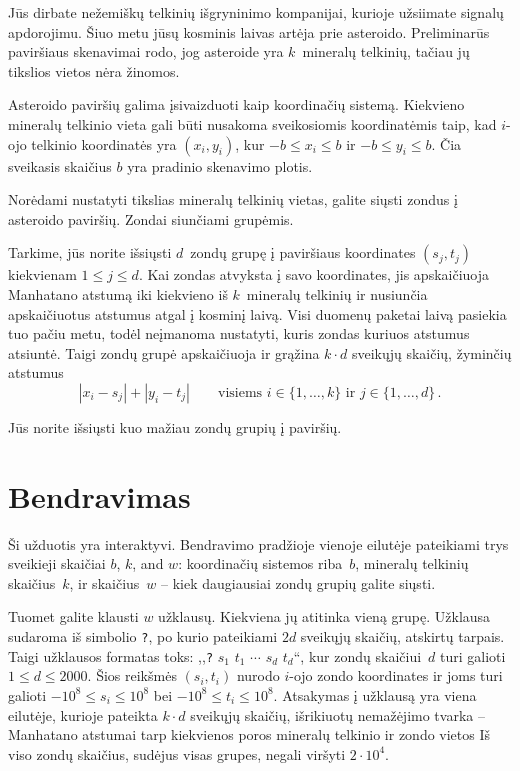 

\noindent
Jūs dirbate nežemiškų telkinių išgryninimo kompanijai, kurioje užsiimate signalų apdorojimu. 
Šiuo metu jūsų kosminis laivas artėja prie asteroido.
Preliminarūs paviršiaus skenavimai rodo, jog asteroide yra $k$~mineralų telkinių, tačiau jų tikslios vietos nėra žinomos.

\medskip

Asteroido paviršių galima įsivaizduoti kaip koordinačių sistemą.
Kiekvieno mineralų telkinio vieta gali būti nusakoma sveikosiomis koordinatėmis taip, kad 
$i$-ojo telkinio koordinatės yra $(x_i, y_i)$, kur
$-b \le x_i \le b$ ir $-b\le y_i \le b$. %
Čia sveikasis skaičius $b$ yra pradinio skenavimo plotis.

Norėdami nustatyti tikslias mineralų telkinių vietas, galite siųsti zondus į asteroido paviršių.
Zondai siunčiami grupėmis.

Tarkime, jūs norite išsiųsti $d$~zondų grupę į paviršiaus koordinates $(s_j,t_j)$ kiekvienam $1\leq j\leq d$.
Kai zondas atvyksta į savo koordinates, 
jis apskaičiuoja Manhatano atstumą iki kiekvieno iš $k$~mineralų telkinių
ir nusiunčia apskaičiuotus atstumus atgal į kosminį laivą.
Visi duomenų paketai laivą pasiekia tuo pačiu metu, todėl neįmanoma nustatyti, kuris zondas kuriuos atstumus atsiuntė.
Taigi zondų grupė apskaičiuoja ir grąžina $k\cdot d$ sveikųjų skaičių, žyminčių atstumus
\[|x_i-s_j| + |y_i - t_j| \qquad\text{visiems } i \in \{1,\ldots,k\} \text{ ir } j \in\{ 1,\ldots,d\}\,.\]

Jūs norite išsiųsti kuo mažiau zondų grupių į paviršių.


\section*{Bendravimas}

Ši užduotis yra interaktyvi.
Bendravimo pradžioje vienoje eilutėje pateikiami trys sveikieji skaičiai $b$, $k$, and $w$:
koordinačių sistemos riba~$b$,
mineralų telkinių skaičius~$k$,
ir skaičius~$w$ -- kiek daugiausiai zondų grupių galite siųsti.

Tuomet galite klausti $w$ užklausų. Kiekviena jų atitinka vieną grupę.
Užklausa sudaroma iš simbolio \texttt{?}, po kurio pateikiami $2d$ sveikųjų skaičių, atskirtų tarpais.
Taigi užklausos formatas toks: ,,\texttt{?} $s_1$ $t_1$ $\cdots$ $s_d$ $t_d$``, kur zondų skaičiui~$d$ turi galioti
$1\leq d\leq 2000$. %
Šios reikšmės $(s_i,t_i)$ nurodo $i$-ojo zondo koordinates ir joms turi galioti
$-10^8 \leq s_i \leq 10^8$ bei $-10^8 \leq t_i \leq 10^8$. %
Atsakymas į užklausą yra viena eilutėje, kurioje pateikta $k \cdot d$ sveikųjų skaičių, išrikiuotų nemažėjimo tvarka -- 
Manhatano atstumai tarp kiekvienos poros mineralų telkinio ir zondo vietos
Iš viso zondų skaičius, sudėjus visas grupes, negali viršyti
$2\cdot 10^4.$ %

